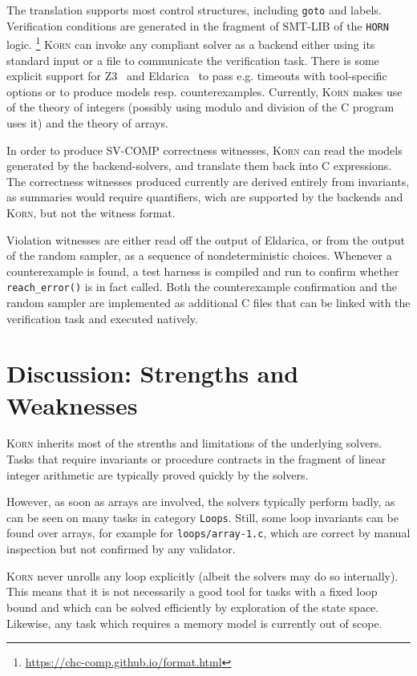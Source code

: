 \documentclass{llncs}
\newcommand{\Korn}{\textsc{Korn}\xspace}
\begin{document}
The translation supports most control structures, including \texttt{goto} and labels.
Verification conditions are generated in the fragment of SMT-LIB of the \texttt{HORN} logic.%
    \footnote{\url{https://chc-comp.github.io/format.html}}
\Korn can invoke any compliant solver as a backend either using its standard input or a file to communicate the verification task.
There is some explicit support for Z3~\cite{gurfinkel2019science} and Eldarica~\cite{hojjat2018eldarica}
to pass e.g. timeouts with tool-specific options or to produce models resp. counterexamples.
Currently, \Korn makes use of the theory of integers (possibly using modulo and division of the C program uses it) and the theory of arrays.

In order to produce SV-COMP correctness witnesses, \Korn can read the models generated by the backend-solvers, and translate them back into C expressions.
The correctness witnesses produced currently are derived entirely from invariants,
as summaries would require quantifiers, wich are supported by the backends and \Korn, but not the witness format.

Violation witnesses are either read off the output of Eldarica,
or from the output of the random sampler, as a sequence of nondeterministic choices.
Whenever a counterexample is found, a test harness is compiled and run to confirm whether \texttt{reach\_error()} is in fact called.
Both the counterexample confirmation and the random sampler are implemented
as additional C files that can be linked with the verification task and executed natively.

\section{Discussion: Strengths and Weaknesses}
\label{sec:discussion}

\Korn inherits most of the strenths and limitations of the underlying solvers.
Tasks that require invariants or procedure contracts in the fragment of linear integer arithmetic
are typically proved quickly by the solvers.

However, as soon as arrays are involved, the solvers typically perform badly,
as can be seen on many tasks in category \texttt{Loops}.
Still, some loop invariants can be found over arrays, for example for \texttt{loops/array-1.c},
which are correct by manual inspection but not confirmed by any validator.

\Korn never unrolls any loop explicitly (albeit the solvers may do so internally).
This means that it is not necessarily a good tool for 
tasks with a fixed loop bound and which can be solved efficiently by exploration of the state space.
Likewise, any task which requires a memory model is currently out of scope.
\end{document}
